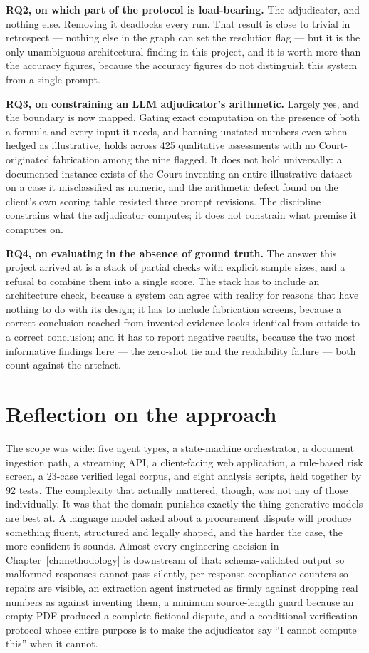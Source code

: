 \textbf{RQ2, on which part of the protocol is load-bearing.} The adjudicator, and
nothing else. Removing it deadlocks every run. That result is close to trivial in
retrospect --- nothing else in the graph can set the resolution flag --- but it is
the only unambiguous architectural finding in this project, and it is worth more
than the accuracy figures, because the accuracy figures do not distinguish this
system from a single prompt.

\textbf{RQ3, on constraining an LLM adjudicator's arithmetic.} Largely yes, and
the boundary is now mapped. Gating exact computation on the presence of both a
formula and every input it needs, and banning unstated numbers even when hedged as
illustrative, holds across 425 qualitative assessments with no Court-originated
fabrication among the nine flagged. It does not hold universally: a documented
instance exists of the Court inventing an entire illustrative dataset on a case it
misclassified as numeric, and the arithmetic defect found on the client's own
scoring table resisted three prompt revisions. The discipline constrains what the
adjudicator computes; it does not constrain what premise it computes on.

\textbf{RQ4, on evaluating in the absence of ground truth.} The answer this
project arrived at is a stack of partial checks with explicit sample sizes, and a
refusal to combine them into a single score. The stack has to include an
architecture check, because a system can agree with reality for reasons that have
nothing to do with its design; it has to include fabrication screens, because a
correct conclusion reached from invented evidence looks identical from outside to a
correct conclusion; and it has to report negative results, because the two most
informative findings here --- the zero-shot tie and the readability failure ---
both count against the artefact.

\section{Reflection on the approach}

The scope was wide: five agent types, a state-machine orchestrator, a document
ingestion path, a streaming API, a client-facing web application, a rule-based
risk screen, a 23-case verified legal corpus, and eight analysis scripts, held
together by 92 tests. The complexity that actually mattered, though, was not any
of those individually. It was that the domain punishes exactly the thing
generative models are best at. A language model asked about a procurement dispute
will produce something fluent, structured and legally shaped, and the harder the
case, the more confident it sounds. Almost every engineering decision in
Chapter~\ref{ch:methodology} is downstream of that: schema-validated output so
malformed responses cannot pass silently, per-response compliance counters so
repairs are visible, an extraction agent instructed as firmly against dropping
real numbers as against inventing them, a minimum source-length guard because an
empty PDF produced a complete fictional dispute, and a conditional verification
protocol whose entire purpose is to make the adjudicator say ``I cannot compute
this'' when it cannot.

